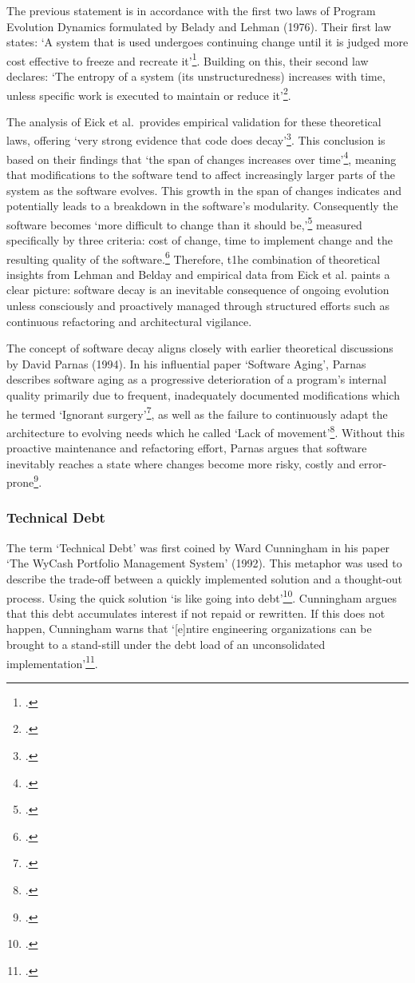The previous statement is in accordance with the first two laws of Program Evolution Dynamics formulated by Belady and Lehman (1976).
Their first law states: `A system that is used undergoes continuing change until it is judged more cost effective to freeze and recreate it'\footcite[228]{beladyModelLargeProgram1976}.
Building on this, their second law declares: `The entropy of a system (its unstructuredness) increases with time, unless specific work is executed to maintain or reduce it'\footcite[228]{beladyModelLargeProgram1976}.

The analysis of Eick et al.\ provides empirical validation for these theoretical laws, offering `very strong evidence that code does decay'\footcite[7]{eickDoesCodeDecay2001}.
This conclusion is based on their findings that `the span of changes increases over time'\footcite[7]{eickDoesCodeDecay2001}, meaning that modifications to the software tend to affect increasingly larger parts of the system as the software evolves. This growth in the span of changes indicates and potentially leads to
a breakdown in the software's modularity. Consequently the software becomes `more difficult to change than it should be,'\footcite[3]{eickDoesCodeDecay2001} measured specifically by three criteria: cost of change, time to implement change and the resulting quality of the software.\footcite[3]{eickDoesCodeDecay2001}
Therefore, t1he combination of theoretical insights from Lehman and Belday and empirical data from Eick et al. paints a clear picture: software decay is an inevitable consequence of ongoing evolution unless consciously and proactively managed through structured efforts such as continuous refactoring and architectural vigilance.

The concept of software decay aligns closely with earlier theoretical discussions by David Parnas (1994). In his influential paper `Software Aging', Parnas describes software aging as a progressive deterioration of a program's internal quality primarily due to frequent, 
inadequately documented modifications which he termed `Ignorant surgery'\footcite[280]{296790}, as well as the failure to continuously adapt the architecture to evolving needs which he called `Lack of movement'\footcite[280]{296790}.
Without this proactive maintenance and refactoring effort, Parnas argues that software inevitably reaches a state where changes become more risky, costly and error-prone\footcite[280-281]{296790}.

\subsubsection{Technical Debt}
The term `Technical Debt' was first coined by Ward Cunningham in his paper `The WyCash Portfolio Management System' (1992). This metaphor was used to describe the trade-off between a quickly implemented solution and a thought-out process. 
Using the quick solution `is like going into debt'\footcite[2]{cunninghamWyCashPortfolioManagement1992}. Cunningham argues that this debt accumulates interest if not repaid or rewritten. 
If this does not happen, Cunningham warns that `[e]ntire engineering organizations can be brought to a stand-still under the debt load of an unconsolidated implementation'\footcite[2]{cunninghamWyCashPortfolioManagement1992}.

